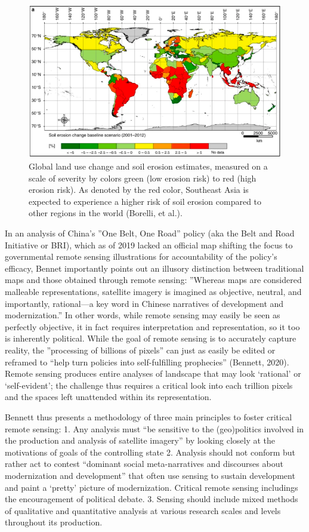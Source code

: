 \documentclass{book}\usepackage{knitr}
\begin{document}
\begin{figure}
\includegraphics[width=\linewidth]{images//land-use/Bonelli_Erosion_Map.png}
\caption{Global land use change and soil erosion estimates, measured on a scale of severity by colors green (low erosion risk) to red (high erosion risk). As denoted by the red color, Southeast Asia is expected to experience a higher risk of soil erosion compared to other regions in the world (Borelli, et al.).}
\label{fig:Bonelli Erosion Map}
\end{figure}

In an analysis of China’s ''One Belt, One Road'' policy (aka the Belt and Road Initiative or BRI), which as of 2019 lacked an official map shifting the focus to governmental remote sensing illustrations for accountability of the policy’s efficacy, Bennet importantly points out an illusory distinction between traditional maps and those obtained through remote sensing: ''Whereas maps are considered malleable representations, satellite imagery is imagined as objective, neutral, and importantly, rational—a key word in Chinese narratives of development and modernization.'' In other words, while remote sensing may easily be seen as perfectly objective, it in fact requires interpretation and representation, so it too is inherently political. While the goal of remote sensing is to accurately capture reality, the ''processing of billions of pixels'' can just as easily be edited or reframed to “help turn policies into self-fulfilling prophecies” (Bennett, 2020). Remote sensing produces entire analyses of landscape that may look ‘rational’ or ‘self-evident’; the challenge thus requires a critical look into each trillion pixels and the spaces left unattended within its representation.

Bennett thus presents a methodology of three main principles to foster critical remote sensing:
1. Any analysis must “be sensitive to the (geo)politics involved in the production and analysis of satellite imagery” by looking closely at the motivations of goals of the controlling state
2. Analysis should not conform but rather act to contest “dominant social meta-narratives and discourses about modernization and development” that often use sensing to sustain development and paint a ‘pretty’ picture of modernization. Critical remote sensing includings the encouragement of political debate.
3. Sensing should include mixed methods of qualitative and quantitative analysis at various research scales and levels throughout its production.
\end{document}
